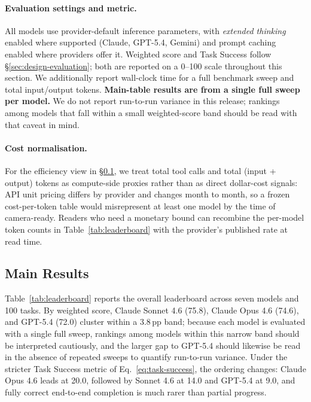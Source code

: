 \paragraph{Evaluation settings and metric.} All models use provider-default inference parameters, with \emph{extended thinking} enabled where supported (Claude, GPT-5.4, Gemini) and prompt caching enabled where providers offer it. Weighted score and Task Success follow \S\ref{sec:design-evaluation}; both are reported on a 0--100 scale throughout this section. We additionally report wall-clock time for a full benchmark sweep and total input/output tokens. \textbf{Main-table results are from a single full sweep per model.} We do not report run-to-run variance in this release; rankings among models that fall within a small weighted-score band should be read with that caveat in mind.

\paragraph{Cost normalisation.} For the efficiency view in \S\ref{sec:exp-main}, we treat total tool calls and total (input + output) tokens as compute-side proxies rather than as direct dollar-cost signals: API unit pricing differs by provider and changes month to month, so a frozen cost-per-token table would misrepresent at least one model by the time of camera-ready. Readers who need a monetary bound can recombine the per-model token counts in Table~\ref{tab:leaderboard} with the provider's published rate at read time.

\subsection{Main Results}
\label{sec:exp-main}

Table~\ref{tab:leaderboard} reports the overall leaderboard across seven models and 100 tasks. By weighted score, Claude Sonnet 4.6 (75.8), Claude Opus 4.6 (74.6), and GPT-5.4 (72.0) cluster within a 3.8\,pp band; because each model is evaluated with a single full sweep, rankings among models within this narrow band should be interpreted cautiously, and the larger gap to GPT-5.4 should likewise be read in the absence of repeated sweeps to quantify run-to-run variance. Under the stricter Task Success metric of Eq.~\eqref{eq:task-success}, the ordering changes: Claude Opus 4.6 leads at 20.0, followed by Sonnet 4.6 at 14.0 and GPT-5.4 at 9.0, and fully correct end-to-end completion is much rarer than partial progress.

